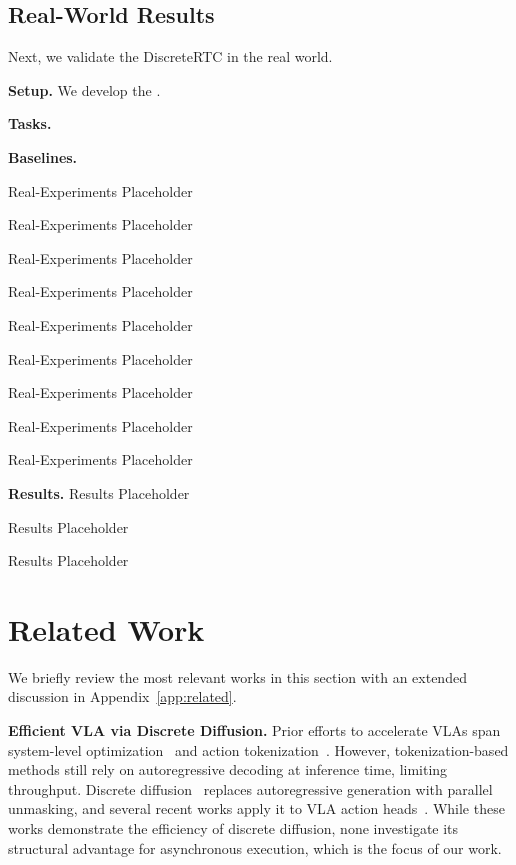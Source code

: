 \documentclass{article}
\begin{document}
\subsection{Real-World Results}
\label{sec:exp_real}

Next, we validate the DiscreteRTC in the real world.

\textbf{Setup.}
We develop the .



\textbf{Tasks.}


\textbf{Baselines.} 

\newpage

Real-Experiments Placeholder

Real-Experiments Placeholder

Real-Experiments Placeholder

Real-Experiments Placeholder

Real-Experiments Placeholder

Real-Experiments Placeholder

Real-Experiments Placeholder

Real-Experiments Placeholder

Real-Experiments Placeholder



\textbf{Results.}
Results Placeholder

Results Placeholder

Results Placeholder



\section{Related Work}
\label{sec:related}

We briefly review the most relevant works in this section with an extended discussion in Appendix~\ref{app:related}.

\textbf{Efficient VLA via Discrete Diffusion.}
Prior efforts to accelerate VLAs span system-level optimization~\citep{ma2025running} and action tokenization~\citep{pertsch2025fast, liu2026oat, intelligence2025pi_}.
However, tokenization-based methods still rely on autoregressive decoding at inference time, limiting throughput.
Discrete diffusion~\citep{lou2023discrete} replaces autoregressive generation with parallel unmasking, and several recent works apply it to VLA action heads~\citep{liang2025discrete, wen2025llada, wen2025dvla, chen2025unified, ye2025dream}.
While these works demonstrate the efficiency of discrete diffusion, none investigate its structural advantage for asynchronous execution, which is the focus of our work.
\end{document}
